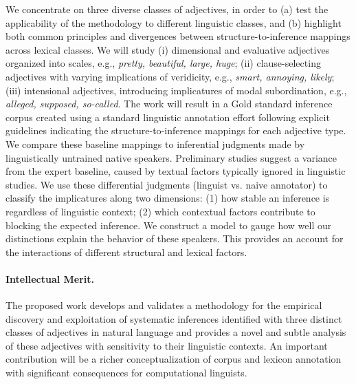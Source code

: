 \documentclass[10pt]{article}
\begin{document}
\vspace{-.5em}

We concentrate on three diverse classes of  adjectives, 
in order to (a) test the applicability of the methodology to different linguistic classes, and (b) highlight both common principles and divergences between structure-to-inference mappings across lexical classes. 
We will study
(i) dimensional and evaluative adjectives organized into scales, e.g., \textit{pretty, beautiful, large, huge}; 
(ii) clause-selecting adjectives with varying implications of veridicity, e.g., \textit{smart, annoying, likely}; 
(iii) intensional adjectives, introducing implicatures of modal subordination, e.g., \textit{alleged, supposed, so-called}. 
The work will result in a Gold standard inference corpus created using a standard linguistic annotation effort following explicit guidelines indicating the structure-to-inference mappings for each adjective type. 
We compare these baseline mappings to inferential judgments made by linguistically untrained native speakers. 
Preliminary studies suggest a variance from the expert baseline, caused by textual factors typically ignored in linguistic studies. 
We use these differential judgments (linguist vs. naive annotator) to classify the implicatures along two dimensions: (1) how stable an inference is regardless of linguistic context; (2) which contextual factors contribute to blocking the expected inference. 
We construct a model to gauge how well our distinctions explain the behavior of these speakers. This provides an account for the interactions of different structural and lexical factors. 

\vspace{-1.2em}
\paragraph{Intellectual Merit.} The proposed work 
develops and validates a methodology for the empirical discovery and exploitation of systematic inferences identified with three distinct classes of adjectives in natural language
and provides a novel and subtle analysis of these adjectives with sensitivity to their linguistic contexts. An important contribution will be a richer conceptualization 
of corpus and lexicon annotation with significant consequences for computational linguists. 

\vspace{-1.2em}
\end{document}
